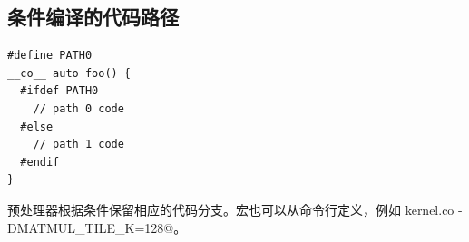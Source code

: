 \subsection*{条件编译的代码路径}

\begin{lstlisting}[language=croqtile,caption={条件代码路径}]
#define PATH0
__co__ auto foo() {
  #ifdef PATH0
    // path 0 code
  #else
    // path 1 code
  #endif
}
\end{lstlisting}

预处理器根据条件保留相应的代码分支。宏也可以从命令行定义，例如 \co@croq kernel.co -DMATMUL_TILE_K=128@。
